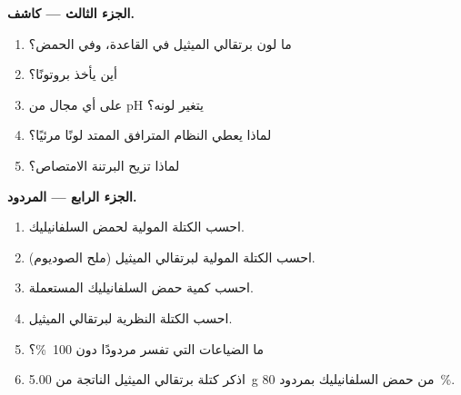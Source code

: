 \begin{problem}
\medskip
\noindent\textbf{الجزء الثالث --- كاشف.}
\begin{enumerate}[resume]
  \item ما لون برتقالي الميثيل في القاعدة، وفي الحمض؟
  \item أين يأخذ بروتونًا؟
  \item على أي مجال من pH يتغير لونه؟
  \item لماذا يعطي النظام المترافق الممتد لونًا مرئيًا؟
  \item لماذا تزيح البرتنة الامتصاص؟
\end{enumerate}

\medskip
\noindent\textbf{الجزء الرابع --- المردود.}
\begin{enumerate}[resume]
  \item احسب الكتلة المولية لحمض السلفانيليك.
  \item احسب الكتلة المولية لبرتقالي الميثيل (ملح الصوديوم).
  \item احسب كمية حمض السلفانيليك المستعملة.
  \item احسب الكتلة النظرية لبرتقالي الميثيل.
  \item ما الضياعات التي تفسر مردودًا دون 100~\%؟
  \item اذكر كتلة برتقالي الميثيل الناتجة من \qty{5.00}{g} من حمض السلفانيليك بمردود 80~\%.
\end{enumerate}
\end{problem}
